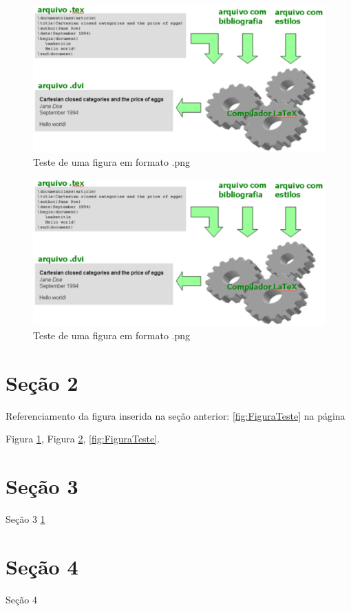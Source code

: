 \begin{figure}[htb]
\centering
\includegraphics[scale=7.0]{mainmatter/images/figura_teste.png}
\caption{Teste de uma figura em formato .png}
\label{fig:FiguraTeste}
\end{figure}

\begin{figure}[htb]
\centering
\includegraphics[scale=7.0]{mainmatter/images/figura_teste.png}
\caption{Teste de uma figura em formato .png}
\label{fig:FiguraTeste2}
\end{figure}


\section{Seção 2}

Referenciamento da figura inserida na seção anterior: \autoref{fig:FiguraTeste} na página \pageref{fig:FiguraTeste}

Figura \ref{fig:FiguraTeste}, Figura \ref{fig:FiguraTeste2}, \autoref{fig:FiguraTeste}.

\section{Seção 3}

Seção 3 \ref{fig:FiguraTeste}


\section{Seção 4}

Seção 4